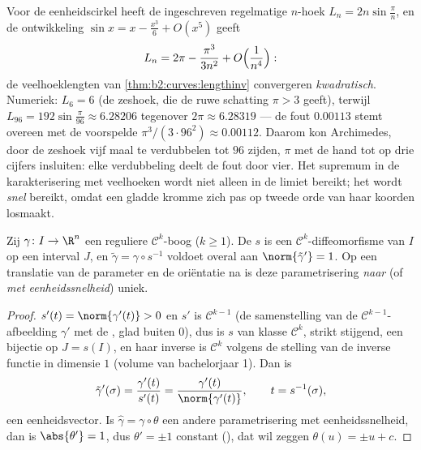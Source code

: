 \begin{example}\label{ex:b2:curves:archimedes}
Voor de eenheidscirkel heeft de ingeschreven regelmatige
$n$-hoek  $L_n = 2n\sin\frac\pi n$, en de ontwikkeling $\sin
x = x - \frac{x^3}6 + O(x^5)$ geeft
\[
L_n = 2\pi - \frac{\pi^3}{3n^2} + O\Bigl(\frac1{n^4}\Bigr) :
\]
de veelhoeklengten van \cref{thm:b2:curves:lengthinv} convergeren
\emph{kwadratisch}. Numeriek: $L_6 = 6$ (de zeshoek, die de ruwe
schatting $\pi > 3$ geeft), terwijl $L_{96} = 192\sin\frac{\pi}{96}
\approx 6.28206$ tegenover $2\pi \approx 6.28319$ --- de fout
$0.00113$ stemt overeen met de voorspelde $\pi^3/(3\cdot96^2)
\approx 0.00112$. Daarom kon Archimedes, door de zeshoek vijf maal
te verdubbelen tot $96$ zijden, $\pi$ met de hand tot op drie
cijfers insluiten: elke verdubbeling deelt de fout door vier. Het
supremum in de karakterisering met veelhoeken wordt niet alleen in
de limiet bereikt; het wordt \emph{snel} bereikt, omdat een gladde
kromme zich pas op tweede orde van haar koorden losmaakt.
\end{example}

\begin{theorem}\label{thm:b2:curves:arclength}
Zij $\gamma \colon I \to \R^n$ een reguliere $\mathcal{C}^k$-boog
($k \geq 1$). De  $s$ is een
$\mathcal{C}^k$-diffeomorfisme van $I$ op een interval $J$, en
$\tilde\gamma = \gamma \circ s^{-1}$ voldoet overal aan
$\norm{\tilde\gamma'} = 1$. Op een translatie van de parameter en
de oriëntatie na is deze parametrisering \emph{naar } (of
\emph{met eenheidssnelheid}) uniek.
\end{theorem}

\begin{proof}
$s'(t) = \norm{\gamma'(t)} > 0$ en $s'$ is $\mathcal{C}^{k-1}$ (de
samenstelling van de $\mathcal{C}^{k-1}$-afbeelding $\gamma'$ met
de , glad buiten $0$), dus is $s$ van klasse $\mathcal{C}^k$,
strikt stijgend, een bijectie op $J = s(I)$, en haar inverse is
$\mathcal{C}^k$ volgens de stelling van de inverse functie in
dimensie $1$ (volume van bachelorjaar 1). Dan is
\[
\tilde\gamma'(\sigma)
= \frac{\gamma'(t)}{s'(t)}
= \frac{\gamma'(t)}{\norm{\gamma'(t)}},
\qquad t = s^{-1}(\sigma),
\]
een eenheidsvector. Is $\hat\gamma = \gamma\circ\theta$ een andere
parametrisering met eenheidssnelheid, dan is $\abs{\theta'} = 1$,
dus $\theta' = \pm 1$ constant (), dat wil zeggen
$\theta(u) = \pm u + c$.
\end{proof}

